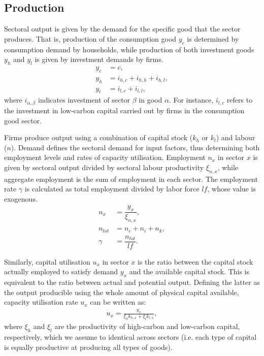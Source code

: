 \documentclass[authoryear]{article}
\begin{document}
\subsection{Production}
\label{sec:output}

Sectoral output is given by the demand for the specific good that the sector produces. That is, production of the consumption good $y_c$ is determined by consumption demand by households, while production of both investment goods $y_h$ and $y_l$ is given by investment demands by firms.
\begin{align}
y_c&=c,  \\
y_h&=i_{h,c}+i_{h,h}+i_{h,l}, \\
y_l&=i_{l,c}+i_{l,l},
\end{align}
where $i_{\alpha,\beta}$ indicates investment of sector $\beta$ in good $\alpha$. For instance, $i_{l,c}$ refers to the investment in low-carbon capital carried out by firms in the consumption good sector. 

Firms produce output using a combination of capital stock ($k_h$ or $k_l$) and labour ($n$). Demand defines the sectoral demand for input factors, thus determining both employment levels and rates of capacity utilisation. Employment $n_x$ in sector $x$ is given by sectoral output divided by sectoral labour productivity $\xi_{n,x}$, while aggregate employment is the sum of employment in each sector. The employment rate $\gamma$ is calculated as total employment divided by labor force $lf$, whose value is exogenous.
\begin{align}
n_x&=\dfrac{y_x}{\xi_{n,x}}, \\
n_{tot} &= n_c + n_i + n_k, \\
\gamma&=\dfrac{n_{tot}}{lf}.
\end{align}

Similarly, capital utilisation $u_x$ in sector $x$ is the ratio between the capital stock actually employed to satisfy demand $y_x$ and the available capital stock. This is equivalent to the ratio between actual and potential output. Defining the latter as the output producible using the whole amount of physical capital available, capacity utilisation rate $u_x$ can be written as:
\begin{gather}
u_x = \frac{y_x}{\xi_{h} k_{h,x} + \xi_{l} k_{l,x}},
\end{gather}
where $\xi_{h}$ and $\xi_{l}$ are the productivity of high-carbon and low-carbon capital, respectively, which we assume to identical across sectors (i.e. each type of capital is equally productive at producing all types of goods). 
\end{document}
